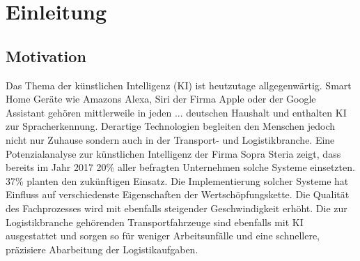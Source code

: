 
\chapter{Einleitung}
\label{ch: Einleitung}
	
	\section{Motivation}
	\label{sec: Motivation}
		Das Thema der künstlichen Intelligenz (KI) ist heutzutage allgegenwärtig. Smart Home Geräte wie Amazons Alexa, Siri der Firma Apple oder der Google Assistant gehören mittlerweile in jeden ... deutschen Haushalt und enthalten KI zur Spracherkennung. Derartige Technologien begleiten den Menschen jedoch nicht nur Zuhause sondern auch in der Transport- und Logistikbranche. Eine Potenzialanalyse zur künstlichen Intelligenz der Firma Sopra Steria zeigt, dass bereits im Jahr 2017 20\% aller befragten Unternehmen solche Systeme einsetzten. 37\% planten den zukünftigen Einsatz. Die Implementierung solcher Systeme hat Einfluss auf verschiedenste Eigenschaften der Wertschöpfungskette. Die Qualität des Fachprozesses wird mit ebenfalls steigender Geschwindigkeit erhöht. Die zur Logistikbranche gehörenden Transportfahrzeuge sind ebenfalls mit KI ausgestattet und sorgen so für weniger Arbeitsunfälle und eine schnellere, präzisiere Abarbeitung der Logistikaufgaben.\\
		
